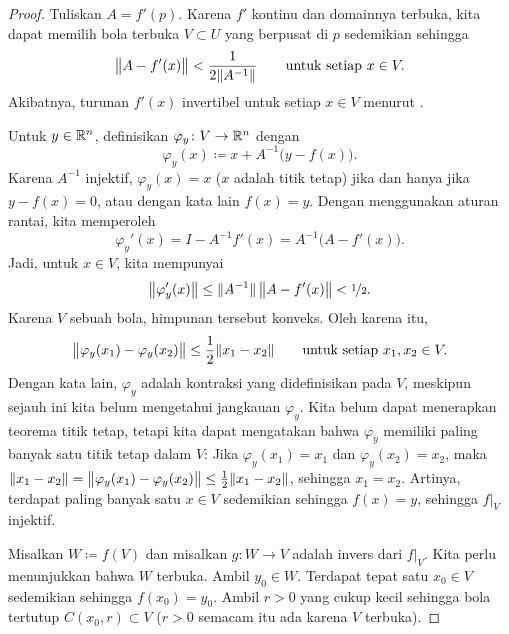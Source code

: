 \begin{proof}
Tuliskan $A = f'(p)$.  Karena $f'$ kontinu dan domainnya terbuka, kita dapat memilih bola terbuka
$V \subset U$ yang berpusat di $p$ sedemikian sehingga
\begin{equation*}
\bigl\lVert {A-f'(x)} \bigr\rVert < \frac{1}{2\lVert {A^{-1}} \rVert}
\qquad \text{untuk setiap } x \in V.
\end{equation*}
Akibatnya, turunan $f'(x)$ invertibel untuk setiap $x \in V$
menurut .

Untuk $y \in {\mathbb{R}}^n$, definisikan $\varphi_y \colon V \to {\mathbb{R}}^n$ dengan
\begin{equation*}
\varphi_y (x) \coloneqq x + A^{-1}\bigl(y-f(x)\bigr) .
\end{equation*}
Karena $A^{-1}$ injektif,
$\varphi_y(x) = x$ ($x$ adalah titik tetap) jika dan hanya jika
$y-f(x) = 0$, atau dengan kata lain $f(x)=y$.  Dengan menggunakan aturan rantai, kita memperoleh
\begin{equation*}
\varphi_y'(x) = I - A^{-1} f'(x) = A^{-1} \bigl( A-f'(x) \bigr) .
\end{equation*}
Jadi, untuk $x \in V$, kita mempunyai
\begin{equation*}
\bigl\lVert {\varphi_y'(x)} \bigr\rVert \leq \lVert {A^{-1}} \rVert \, \bigl\lVert {A-f'(x)} \bigr\rVert < \nicefrac{1}{2} .
\end{equation*}
Karena $V$ sebuah bola, himpunan tersebut konveks.  Oleh karena itu,
\begin{equation*}
\bigl\lVert {\varphi_y(x_1)-\varphi_y(x_2)} \bigr\rVert \leq \frac{1}{2} \lVert {x_1-x_2} \rVert 
\qquad
\text{untuk setiap } x_1,x_2 \in V.
\end{equation*}
Dengan kata lain, $\varphi_y$ adalah kontraksi yang didefinisikan pada $V$, meskipun sejauh ini
kita belum mengetahui jangkauan $\varphi_y$.  Kita belum dapat
menerapkan teorema titik
tetap, tetapi kita dapat mengatakan bahwa $\varphi_y$ 
memiliki paling banyak satu titik tetap dalam $V$:
Jika $\varphi_y(x_1) = x_1$ dan
$\varphi_y(x_2) = x_2$, maka
$\lVert {x_1-x_2} \rVert = \bigl\lVert {\varphi_y(x_1)-\varphi_y(x_2)} \bigr\rVert \leq
\frac{1}{2} \lVert {x_1-x_2} \rVert$, sehingga $x_1 = x_2$.
Artinya, terdapat paling banyak satu $x \in V$
sedemikian sehingga $f(x) = y$, sehingga $f|_V$ injektif.

Misalkan $W \coloneqq f(V)$ dan misalkan $g \colon W \to V$ adalah invers dari $f|_V$.
Kita perlu menunjukkan bahwa $W$ terbuka.  Ambil $y_0 \in W$.
Terdapat tepat satu $x_0 \in V$ sedemikian sehingga $f(x_0) = y_0$.
Ambil $r > 0$ yang cukup kecil sehingga bola tertutup $C(x_0,r) \subset V$
($r > 0$ semacam itu ada karena $V$ terbuka).


\end{proof}
